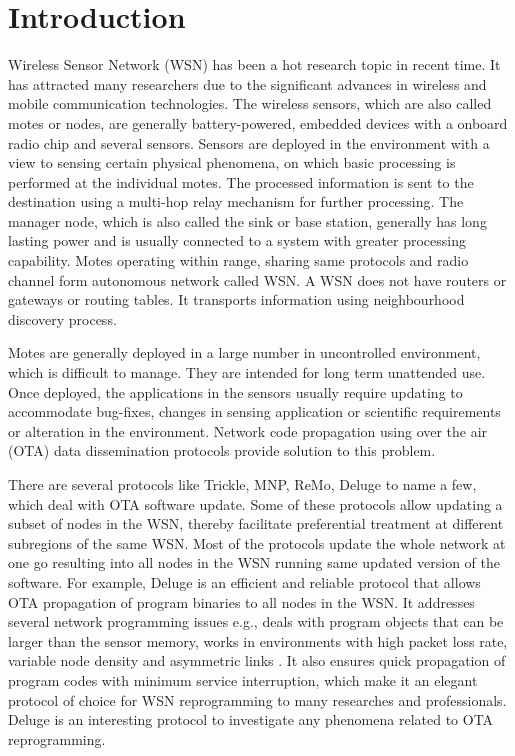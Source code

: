 \documentclass[conference,final]{IEEEtran}
\begin{document}

\section{Introduction}
\label{sec:intro}
Wireless Sensor Network (WSN) has been a hot research topic in recent time.
It has attracted many researchers due to the significant advances in wireless and mobile communication technologies.
The wireless sensors, which are also called motes or nodes, are generally battery-powered, embedded devices with a onboard radio chip and several sensors.
Sensors are deployed in the environment with a view to sensing certain physical phenomena, on which basic processing is performed at the individual motes.
The processed information is sent to the destination using a multi-hop relay mechanism for further processing.
The manager node, which is also called the sink or base station, generally has long lasting power and is usually connected to a system with greater processing capability.
Motes operating within range, sharing same protocols and radio channel form autonomous network called WSN.
A WSN does not have routers or gateways or routing tables.
It transports information using neighbourhood discovery process.

Motes are generally deployed in a large number in uncontrolled environment, which is difficult to manage.
They are intended for long term unattended use.
Once deployed, the applications in the sensors usually require updating to accommodate bug-fixes, changes in sensing application or scientific requirements or alteration in the environment.
Network code propagation using over the air (OTA) data dissemination protocols provide solution to this problem.

There are several protocols like Trickle, MNP, ReMo, Deluge to name a few, which deal with OTA software update.
Some of these protocols allow updating a subset of nodes in the WSN, thereby facilitate preferential treatment at different subregions of the same WSN.
Most of the protocols update the  whole network at one go resulting into all nodes in the WSN running same updated version of the software.
For example, Deluge is an efficient and reliable protocol that allows OTA propagation of program binaries to all nodes in the WSN.
It addresses several network programming issues e.g., deals with program objects that can be larger than the sensor memory, works in environments with high packet loss rate, variable node density and asymmetric links \cite{1031506}.
It also ensures quick propagation of program codes with minimum service interruption, which make it an elegant protocol of choice for  WSN reprogramming to many researches and professionals.
Deluge is an interesting protocol to investigate any phenomena related to OTA reprogramming.
\end{document}
